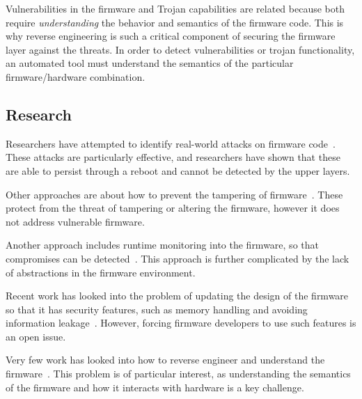 \documentclass[11pt,letterpaper]{article}
\begin{document}

Vulnerabilities in the firmware and Trojan capabilities are related
because both require \emph{understanding} the behavior and semantics
of the firmware code. This is why reverse engineering is such a
critical component of securing the firmware layer against the threats.
In order to detect vulnerabilities or trojan functionality, an
automated tool must understand the semantics of the particular
firmware/hardware combination. 

\subsection{Research}
Researchers have attempted to identify real-world attacks on firmware
code~\cite{Tsow2006, Cui2010, Duflot2011, Basnight2013, Cui2013,
  Zaddach2013, Zaddach2013a, Maskiewicz2014, Stuttgen2015}. These
attacks are particularly effective, and researchers have shown that
these are able to persist through a reboot and cannot be detected by
the upper layers. 

Other approaches are about how to prevent the tampering of
firmware~\cite{Adelstein2002, Zhou2007, Zhou2009}. These protect from
the threat of tampering or altering the firmware, however it does not
address vulnerable firmware. 

Another approach includes runtime monitoring into the
firmware, so that compromises can be detected~\cite{Cui2010a,
  Cui2011}. This approach is further complicated by the lack of
abstractions in the firmware environment. 

Recent work has looked into the problem of updating the design of the
firmware so that it has security features, such as memory handling and
avoiding information leakage~\cite{Koeberl2014, Kauer2007}. However,
forcing firmware developers to use such features is an open issue.

Very few work has looked into how to reverse engineer and understand the
firmware~\cite{Zaddach2014}. This problem is of particular interest,
as understanding the semantics of the firmware and how it interacts
with hardware is a key challenge. 
\end{document}
